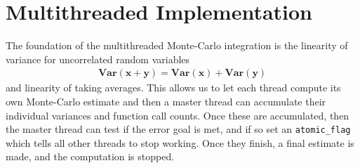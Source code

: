 \documentclass[landscape]{article}
\numberwithin{equation}{section}
\begin{document}
\section{Multithreaded Implementation}

The foundation of the multithreaded Monte-Carlo integration is the linearity of variance for uncorrelated random variables
\begin{align*}
\mathbf{Var}(\mathbf{x} + \mathbf{y}) = \mathbf{Var}(\mathbf{x}) + \mathbf{Var}(\mathbf{y})
\end{align*}
and linearity of taking averages.
This allows us to let each thread compute its own Monte-Carlo estimate and then a master thread can accumulate their individual variances and function call counts.
Once these are accumulated, then the master thread can test if the error goal is met, and if so set an \texttt{atomic\_flag} which tells all other threads to stop working.
Once they finish, a final estimate is made, and the computation is stopped.
\end{document}
